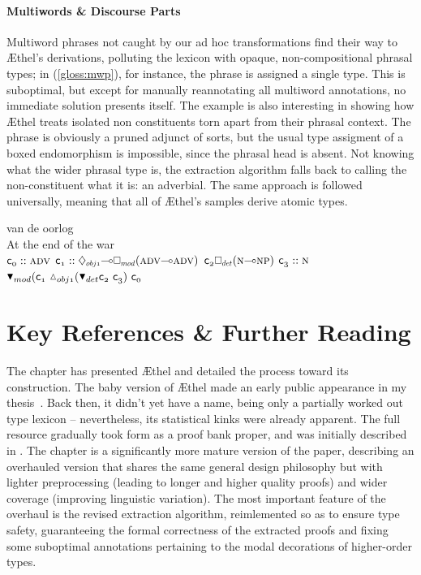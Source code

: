 \paragraph{Multiwords \& Discourse Parts}
Multiword phrases not caught by our ad hoc transformations find their way to \AE thel's derivations, polluting the lexicon with opaque, non-compositional phrasal types;
in (\ref{gloss:mwp}), for instance, the phrase  is assigned a single type.
This is suboptimal, but except for manually reannotating all multiword annotations, no immediate solution presents itself.
The example is also interesting in showing how \AE thel treats isolated non constituents torn apart from their phrasal context.
The phrase is obviously a pruned adjunct of sorts, but the usual type assigment of a boxed endomorphism is impossible, since the phrasal head is absent.
Not knowing what the wider phrasal type is, the extraction algorithm falls back to calling the non-constituent what it is: an adverbial.
The same approach is followed universally, meaning that all of \AE thel's samples derive atomic types.

\begin{exe}
\label{gloss:mwp}
 van de oorlog\\
{At the end} of the war\\
	$\con{0}::\adv[s]$
	$\con{1}::\ddia{obj1}\li\dbox{mod}(\adv[s]\li\adv[s])$
	$\con{2}\dbox{det}(\n[s]\li\np[s])$
	$\con{3}::\n[s]$
\\
{\small
  $\term{
	\dboxelim{mod}(\con{1}~\ddiaintro{obj1}(
		\dboxelim{det}\con{2}~\con{3}
	)
	~\con{0}
  }
  $}
\end{exe}


\section{Key References \& Further Reading}
\label{section:references_3}
The chapter has presented \AE thel and detailed the process toward its construction.
The baby version of \AE thel made an early public appearance in my thesis~\cite{https://doi.org/10.48550/arxiv.1909.02955}.
Back then, it didn't yet have a name, being only a partially worked out type lexicon -- nevertheless, its statistical kinks were already apparent.
The full resource gradually took form as a proof bank proper, and was initially described in \citet{kogkalidis-etal-2020-aethel}.
The chapter is a significantly more mature version of the paper, describing an overhauled version that shares the same general design philosophy but with lighter preprocessing (leading to longer and higher quality proofs) and wider coverage (improving linguistic variation).
The most important feature of the overhaul is the revised extraction algorithm, reimlemented so as to ensure type safety, guaranteeing the formal correctness of the extracted proofs and fixing some suboptimal annotations pertaining to the modal decorations of higher-order types.

